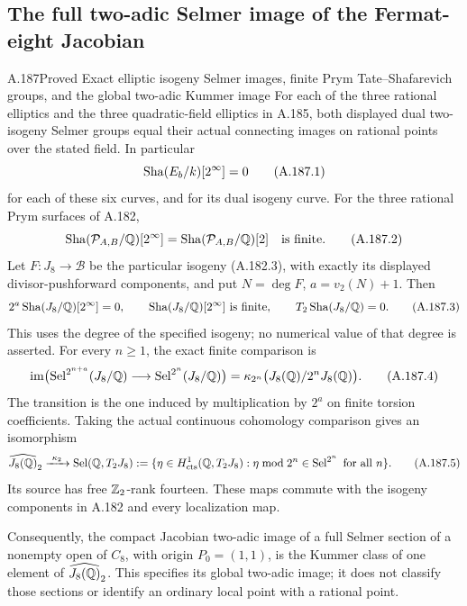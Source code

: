 \subsection{The full two-adic Selmer image of the Fermat-eight Jacobian}

\begin{statement}{A.187}{Proved}
{Exact elliptic isogeny Selmer images, finite Prym Tate--Shafarevich
groups, and the global two-adic Kummer image}
For each of the three rational elliptics and the three
quadratic-field elliptics in A.185, both displayed dual
two-isogeny Selmer groups equal their actual connecting
images on rational points over the stated field.  In particular
\[
                         \operatorname{Sha}(E_b/k)[2^\infty]=0
\tag{A.187.1}
\]
for each of these six curves, and for its dual isogeny curve.
For the three rational Prym surfaces of A.182,
\[
  \operatorname{Sha}(\mathcal P_{A,B}/\mathbb Q)[2^\infty]
       =\operatorname{Sha}(\mathcal P_{A,B}/\mathbb Q)[2]
       \quad\text{is finite}.
\tag{A.187.2}
\]
Let \(F:J_8\to\mathcal B\) be the particular isogeny
(A.182.3), with exactly its displayed divisor-pushforward
components, and put
\(N=\deg F\), \(a=v_2(N)+1\).  Then
\[
 2^a\operatorname{Sha}(J_8/\mathbb Q)[2^\infty]=0,
 \qquad\operatorname{Sha}(J_8/\mathbb Q)[2^\infty]\text{ is finite},
 \qquad T_2\operatorname{Sha}(J_8/\mathbb Q)=0.
\tag{A.187.3}
\]
This uses the degree of the specified isogeny; no numerical
value of that degree is asserted.
For every \(n\geq1\), the exact finite comparison is
\[
 \operatorname{im}\bigl(
    \operatorname{Sel}^{2^{n+a}}(J_8/\mathbb Q)
         \longrightarrow\operatorname{Sel}^{2^n}(J_8/\mathbb Q)
                       \bigr)
 =\kappa_{2^n}\bigl(J_8(\mathbb Q)/2^nJ_8(\mathbb Q)\bigr).
\tag{A.187.4}
\]
The transition is the one induced by multiplication by
\(2^a\) on finite torsion coefficients.  Taking the actual
continuous cohomology comparison gives an isomorphism
\[
 \widehat{J_8(\mathbb Q)}_2
       \xrightarrow{\ \kappa_2\ }
 \operatorname{Sel}(\mathbb Q,T_2J_8)
 :=\{\eta\in H^1_{\rm cts}(\mathbb Q,T_2J_8):
       \eta\bmod2^n\in\operatorname{Sel}^{2^n}
                         \text{ for all }n\}.
\tag{A.187.5}
\]
Its source has free \(\mathbb Z_2\)-rank fourteen.  These maps
commute with the isogeny components in A.182 and every
localization map.

Consequently, the compact Jacobian two-adic image of a
full Selmer section of a nonempty open of \(C_8\), with
origin \(P_0=(1,1)\), is the Kummer class of one element
of \(\widehat{J_8(\mathbb Q)}_2\).  This specifies its global
two-adic image; it does not classify those sections or
identify an ordinary local point with a rational point.
\end{statement}

